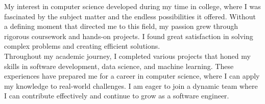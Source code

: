\vspace*{10pt}
My interest in computer science developed during my time in college, where I was fascinated by the subject matter and the endless possibilities it offered. Without a defining moment that directed me to this field, my passion grew through rigorous coursework and hands-on projects. I found great satisfaction in solving complex problems and creating efficient solutions.
\\
\vspace*{5pt}
Throughout my academic journey, I completed various projects that honed my skills in software development, data science, and machine learning. These experiences have prepared me for a career in  computer science, where I can apply my knowledge to real-world challenges. I am eager to join a dynamic team where I can contribute effectively and continue to grow as a software engineer.
